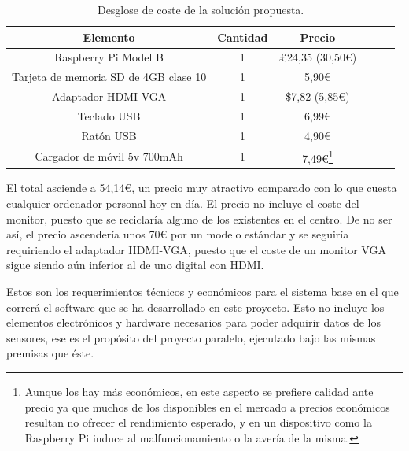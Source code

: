 \begin{savenotes}
\begin{table}[!ht]
  \centering
  \begin{tabular}{| c | c | c | c | c | c |}
  	\hline
    Elemento & Cantidad & Precio \\ \hline
   Raspberry Pi Model B & 1 & \pounds{24,35} (30,50€) \\ \hline
   Tarjeta de memoria SD de 4GB clase 10\cite{amazon_SD4GB} & 1 & 5,90€ \\ \hline
   Adaptador HDMI-VGA\cite{dhgate_vga} & 1 & \$7,82 (5,85€) \\ \hline
   Teclado USB\cite{amazon_tecladousb} & 1 & 6,99€ \\ \hline
   Ratón USB\cite{amazon_ratonusb} & 1 & 4,90€ \\ \hline
   Cargador de móvil 5v 700mAh\cite{amazon_cargadorusb} & 1 & 7,49€\footnote{Aunque los hay más económicos, en este aspecto se prefiere calidad ante precio ya que muchos de los disponibles en el mercado a precios económicos resultan no ofrecer el rendimiento esperado, y en un dispositivo como la Raspberry Pi induce al malfuncionamiento o la avería de la misma.} \\ \hline 
  \end{tabular}
  \caption{Desglose de coste de la solución propuesta.}
  \label{tab:desglose_precios}
\end{table}
\end{savenotes}

El total asciende a 54,14€, un precio muy atractivo comparado con lo que cuesta cualquier ordenador personal hoy en día. El precio no incluye el coste del monitor, puesto que se reciclaría alguno de los existentes en el centro. De no ser así, el precio ascendería unos 70€ por un modelo estándar y se seguiría requiriendo el adaptador HDMI-VGA, puesto que el coste de un monitor VGA sigue siendo aún inferior al de uno digital con HDMI.

Estos son los requerimientos técnicos y económicos para el sistema base en el que correrá el software que se ha desarrollado en este proyecto. Esto no incluye los elementos electrónicos y hardware necesarios para poder adquirir datos de los sensores, ese es el propósito del proyecto paralelo, ejecutado bajo las mismas premisas que éste.


